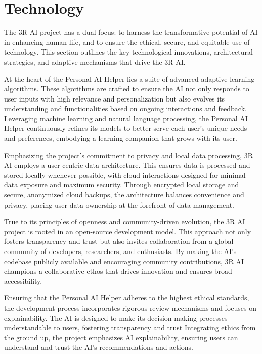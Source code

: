 \documentclass[12pt]{article}
\begin{document}
\section*{Technology}

The 3R AI project has a dual focus: to harness the transformative potential of AI in enhancing human life, and to ensure the ethical, secure, and equitable use of technology. This section outlines the key technological innovations, architectural strategies, and adaptive mechanisms that drive the 3R AI.

At the heart of the Personal AI Helper lies a suite of advanced adaptive learning algorithms. These algorithms are crafted to ensure the AI not only responds to user inputs with high relevance and personalization but also evolves its understanding and functionalities based on ongoing interactions and feedback. Leveraging machine learning and natural language processing, the Personal AI Helper continuously refines its models to better serve each user's unique needs and preferences, embodying a learning companion that grows with its user.

Emphasizing the project's commitment to privacy and local data processing, 3R AI employs a user-centric data architecture. This ensures data is processed and stored locally whenever possible, with cloud interactions designed for minimal data exposure and maximum security. Through encrypted local storage and secure, anonymized cloud backups, the architecture balances convenience and privacy, placing user data ownership at the forefront of data management.

True to its principles of openness and community-driven evolution, the 3R AI project is rooted in an open-source development model. This approach not only fosters transparency and trust but also invites collaboration from a global community of developers, researchers, and enthusiasts. By making the AI's codebase publicly available and encouraging community contributions, 3R AI champions a collaborative ethos that drives innovation and ensures broad accessibility.

Ensuring that the Personal AI Helper adheres to the highest ethical standards, the development process incorporates rigorous review mechanisms and focuses on explainability. The AI is designed to make its decision-making processes understandable to users, fostering transparency and trust Integrating ethics from the ground up, the project emphasizes AI explainability, ensuring users can understand and trust the AI's recommendations and actions.
\end{document}
